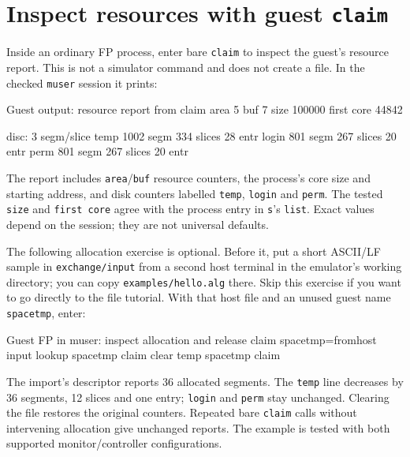 \section{\texorpdfstring{Inspect resources with guest \texttt{claim}}{Inspect resources with guest claim}}\label{inspect-resources-with-guest-claim}

Inside an ordinary FP process, enter bare \passthrough{\lstinline!claim!} to inspect the guest's resource report. This is not a simulator command and does not create a file. In the checked \passthrough{\lstinline!muser!} session it prints:

\begin{commandexample}{Guest output: resource report from claim}
area 5   buf 7   size 100000   first core 44842

disc: 3 segm/slice
  temp      1002 segm     334 slices      28 entr
  login      801 segm     267 slices      20 entr
  perm       801 segm     267 slices      20 entr
\end{commandexample}

The report includes \passthrough{\lstinline!area!}/\passthrough{\lstinline!buf!} resource counters, the process's core size and starting address, and disk counters labelled \passthrough{\lstinline!temp!}, \passthrough{\lstinline!login!} and \passthrough{\lstinline!perm!}. The tested \passthrough{\lstinline!size!} and \passthrough{\lstinline!first core!} agree with the process entry in \passthrough{\lstinline!s!}'s \passthrough{\lstinline!list!}. Exact values depend on the session; they are not universal defaults.

The following allocation exercise is optional. Before it, put a short ASCII/LF
sample in \texttt{exchange/input} from a second host terminal in the emulator's
working directory; you can copy \texttt{examples/hello.alg} there. Skip this
exercise if you want to go directly to the file tutorial. With that host file
and an unused guest name \texttt{spacetmp}, enter:

\begin{commandexample}{Guest FP in muser: inspect allocation and release}
claim
spacetmp=fromhost input
lookup spacetmp
claim
clear temp spacetmp
claim
\end{commandexample}

The import's descriptor reports 36 allocated segments. The \passthrough{\lstinline!temp!} line decreases by 36 segments, 12 slices and one entry; \passthrough{\lstinline!login!} and \passthrough{\lstinline!perm!} stay unchanged. Clearing the file restores the original counters. Repeated bare \passthrough{\lstinline!claim!} calls without intervening allocation give unchanged reports. The example is tested with both supported monitor/controller configurations.

